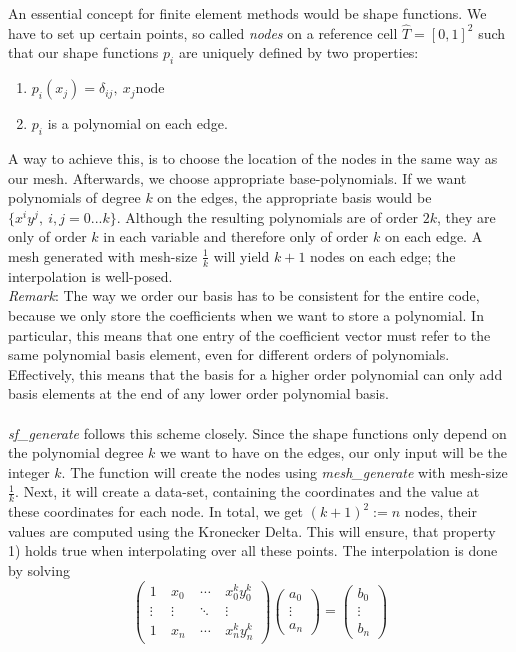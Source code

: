 An essential concept for finite element methods would be shape functions. We have to set up certain points, so called \textit{nodes} on a reference cell $\hat T = [0,1]^2$ such that our shape functions $p_i$ are uniquely defined by two properties: 
\begin{enumerate}
\item $p_i(x_j)=\delta_{ij}, \ x_j \mbox{node}$
\item $p_i$ is a polynomial on each edge.
\end{enumerate} 
A way to achieve this, is to choose the location of the nodes in the same way as our mesh. Afterwards, we choose appropriate base-polynomials. If we want polynomials of degree $k$ on the edges, the appropriate basis would be $\{x^iy^j, \ i,j=0...k\}$. Although the resulting polynomials are of order $2k$, they are only of order $k$ in each variable and therefore only of order $k$ on each edge. A mesh generated with mesh-size $\frac{1}{k}$ will yield $k+1$ nodes on each edge; the interpolation is well-posed. \\
\textit{Remark}: The way we order our basis has to be consistent for the entire code, because we only store the coefficients when we want to store a polynomial. In particular, this means that one entry of the coefficient vector must refer to the same polynomial basis element, even for different orders of polynomials. Effectively, this means that the basis for a higher order polynomial can only add basis elements at the end of any lower order polynomial basis. \\
\\
\textit{sf\_generate} follows this scheme closely. Since the shape functions only depend on the polynomial degree $k$ we want to have on the edges, our only input will be the integer $k$. The function will create the nodes using \textit{mesh\_generate} with mesh-size $\frac{1}{k}$. Next, it will create a data-set, containing the coordinates and the value at these coordinates for each node. In total, we get $(k+1)^2:=n$ nodes, their values are computed using the Kronecker Delta. This will ensure, that property 1) holds true when interpolating over all these points. The interpolation is done by solving
\[\begin{pmatrix} 1 &\ x_0 &\ \cdots &\ x_0^ky_0^k \\
\vdots &\ \vdots &\ \ddots &\ \vdots \\ 
1 &\ x_{n} &\ \cdots &\ x_{n}^ky_{n}^k \end{pmatrix}
\begin{pmatrix} a_0 \\ \vdots \\ a_n \end{pmatrix}=\begin{pmatrix} b_0 \\ \vdots \\ b_n \end{pmatrix}\]
